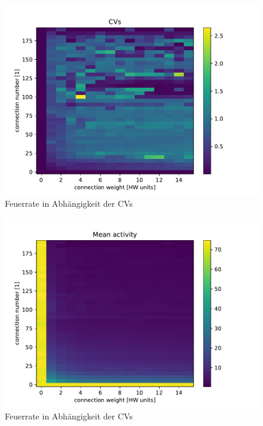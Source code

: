 \documentclass[10pt,a4paper]{scrartcl}
\begin{document}
\begin{figure} [ht]
\begin{center}
\label{fig:abb4}
\caption{Feuerrate in Abhängigkeit der CVs}
\includegraphics[scale=0.45]{pictures/CVs.pdf}
\end{center}
\end{figure}

\begin{figure} [ht]
\begin{center}
\label{fig:abb4}
\caption{Feuerrate in Abhängigkeit der CVs}
\includegraphics[scale=0.45]{pictures/mean_activity.pdf}
\end{center}
\end{figure}
\end{document}
